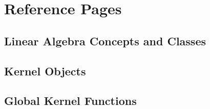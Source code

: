 
\chapter{Reference Pages}

\lcTex{}

\clearpage
\section{Linear Algebra Concepts and Classes}
\gdef\ccRefPageBreak{\ccFalse}

\gdef\ccRefPageBreak{\ccTrue}





\clearpage
\section{Kernel Objects}
\gdef\ccRefPageBreak{\ccFalse}


\gdef\ccRefPageBreak{\ccTrue}












\clearpage
\section{Global Kernel Functions}
\gdef\ccRefPageBreak{\ccFalse}


\gdef\ccRefPageBreak{\ccTrue}





















